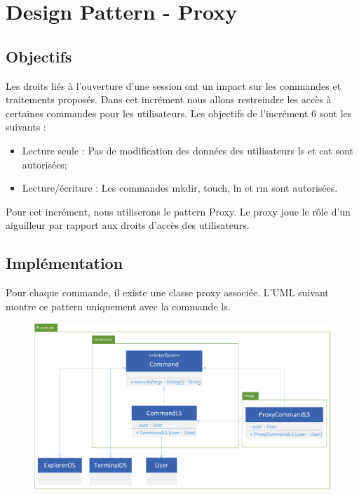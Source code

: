 \newpage
\section{Design Pattern - Proxy}

\subsection{Objectifs}

Les droits liés à l’ouverture d’une session ont un impact sur les commandes et traitements proposés. Dans cet incrément nous allons restreindre les accès à certaines commandes pour les utilisateurs. Les objectifs de l'incrément 6 sont les suivants :\\
\begin{itemize}
\item Lecture seule : Pas de modification des données des utilisateurs ls et cat sont autorisées;
\item Lecture/écriture : Les commandes mkdir, touch, ln et rm sont autorisées.\\
\end{itemize}

Pour cet incrément,  nous utiliserons le pattern Proxy. Le proxy joue le rôle d’un aiguilleur par rapport aux droits d’accès des utilisateurs. 

\subsection{Implémentation}

Pour chaque commande, il existe une classe proxy associée. L'UML suivant montre ce pattern uniquement avec la commande ls.

\begin{figure}[!h]
\centering
\includegraphics[width=\textwidth]{../uml/uml-proxy}
\end{figure}

